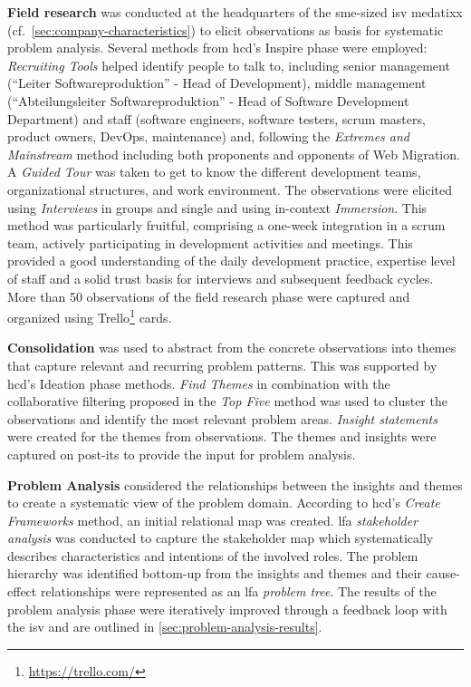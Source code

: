 \textbf{Field research} was conducted at the headquarters of the \gls{sme}-sized \gls{isv} medatixx (cf.~\cref{sec:company-characteristics}) to elicit observations as basis for systematic problem analysis.
Several methods from \gls{hcd}'s Inspire phase were employed: \emph{Recruiting Tools} helped identify people to talk to, including senior management (``Leiter Softwareproduktion'' - Head of Development), middle management (``Abteilungsleiter Softwareproduktion'' - Head of Software Development Department) and staff (software engineers, software testers, scrum masters, product owners, DevOps, maintenance) and, following the \emph{Extremes and Mainstream} method including both proponents and opponents of \gls{Web Migration}.
A \emph{Guided Tour} was taken to get to know the different development teams, organizational structures, and work environment.
The observations were elicited using \emph{Interviews} in groups and single and using in-context \emph{Immersion}.
This method was particularly fruitful, comprising a one-week integration in a scrum team, actively participating in development activities and meetings.
This provided a good understanding of the daily development practice, expertise level of staff and a solid trust basis for interviews and subsequent feedback cycles.
More than 50 observations of the field research phase were captured and organized using Trello\footnote{\url{https://trello.com/}} cards.

\textbf{Consolidation} was used to abstract from the concrete observations into themes that capture relevant and recurring problem patterns.
This was supported by \gls{hcd}'s Ideation phase methods.
\emph{Find Themes} in combination with the collaborative filtering proposed in the \emph{Top Five} method was used to cluster the observations and identify the most relevant problem areas.
\emph{Insight statements} were created for the themes from observations.
The themes and insights were captured on post-its to provide the input for problem analysis.

\textbf{Problem Analysis} considered the relationships between the insights and themes to create a systematic view of the problem domain.
According to \gls{hcd}'s \emph{Create Frameworks} method, an initial relational map was created.
\gls{lfa} \emph{stakeholder analysis} was conducted to capture the stakeholder map which systematically describes characteristics and intentions of the involved roles.
The problem hierarchy was identified bottom-up from the insights and themes and their cause-effect relationships were represented as an \gls{lfa} \emph{problem tree}.
The results of the problem analysis phase were iteratively improved through a feedback loop with the \gls{isv} and are outlined in \cref{sec:problem-analysis-results}.

